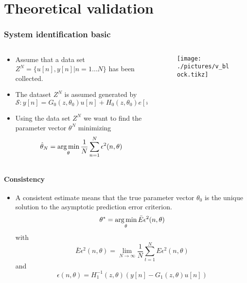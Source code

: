 \section{Theoretical validation}
\begin{frame}
	\frametitle{System identification basic}
	\begin{columns}
		\begin{column}{0.5\textwidth}
			\begin{itemize}
				\item Assume that a data set $Z^N = \{u[n],y[n]|n=1\ldots N\}$ has been collected.
				\item The dataset $Z^N$ is assumed generated by
					\begin{equation}
						\mathcal{S}: y[n] = G_0(z,\theta_0)u[n] + H_0(z,\theta_0)e[n]
					\end{equation}
				\item Using the data set $Z^N$ we want to find the parameter vector $\theta^N$ minimizing
\begin{equation}\label{eq:pred}
		\hat{\theta}_N = \operatorname*{arg\,min}_{\theta} \frac{1}{N}\sum_{n=1}^N \epsilon^2(n,\theta)
\end{equation}
			\end{itemize}
		\end{column}
		\begin{column}{0.5\textwidth}
			\begin{figure}
				\texttt{[image: ./pictures/v\_block.tikz]}
			\end{figure}
		\end{column}
	\end{columns}
\end{frame}
\begin{frame}
	\framesubtitle{Consistency}
	\begin{itemize}
	\item A consistent estimate means that the true parameter vector $\theta_0$ is the unique solution to the asymptotic prediction error criterion.
\begin{equation}\label{eq:theta_1}
		\theta^*= \operatorname*{arg\,min}_{\theta} \bar{E}\epsilon^2(n,\theta)
\end{equation}
with
\begin{equation}
		\bar{E}\epsilon^2(n,\theta) = \lim_{N\to\infty}\frac{1}{N}\sum_{t=1}^N E\epsilon^2(n,\theta)
\end{equation}
and
\begin{equation}\label{eq:epsi}
		\epsilon(n,\theta)=H_1^{-1}(z,\theta)(y[n]-G_1(z,\theta)u[n])
\end{equation}
\end{itemize}
\end{frame}

